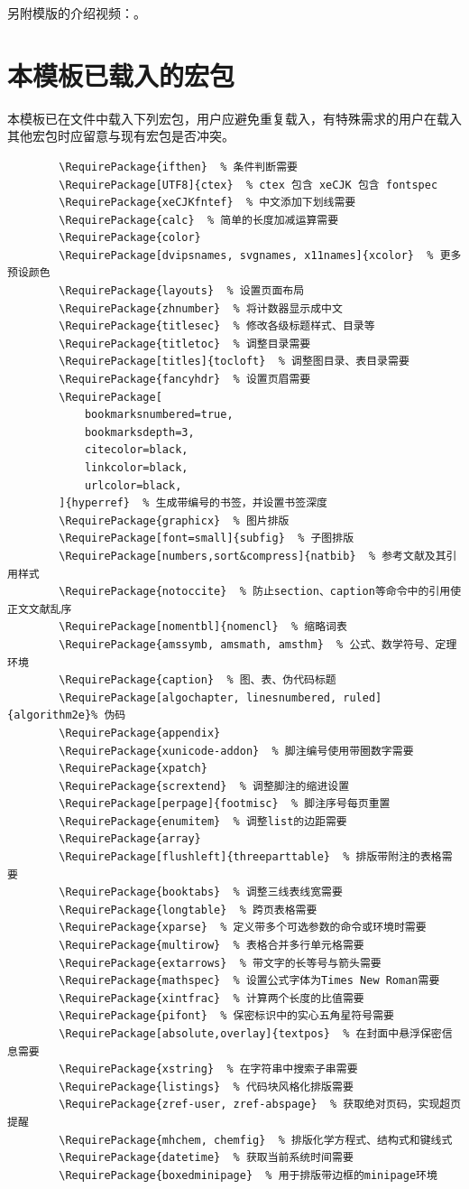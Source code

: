 \documentclass[doctor, vlined, ]{DissertUESTC}
\begin{document}
	另附模版的介绍视频：\href{https://www.bilibili.com/video/BV18MEx6BEnv}{\color{DarkRed}}。


	\section{本模板已载入的宏包}

	本模板已在文件中载入下列宏包，用户应避免重复载入，有特殊需求的用户在载入其他宏包时应留意与现有宏包是否冲突。

	\begin{verbatim}
		\RequirePackage{ifthen}  % 条件判断需要
		\RequirePackage[UTF8]{ctex}  % ctex 包含 xeCJK 包含 fontspec
		\RequirePackage{xeCJKfntef}  % 中文添加下划线需要
		\RequirePackage{calc}  % 简单的长度加减运算需要
		\RequirePackage{color}
		\RequirePackage[dvipsnames, svgnames, x11names]{xcolor}  % 更多预设颜色
		\RequirePackage{layouts}  % 设置页面布局
		\RequirePackage{zhnumber}  % 将计数器显示成中文
		\RequirePackage{titlesec}  % 修改各级标题样式、目录等
		\RequirePackage{titletoc}  % 调整目录需要
		\RequirePackage[titles]{tocloft}  % 调整图目录、表目录需要
		\RequirePackage{fancyhdr}  % 设置页眉需要
		\RequirePackage[
			bookmarksnumbered=true,
			bookmarksdepth=3,
			citecolor=black,
			linkcolor=black,
			urlcolor=black,
		]{hyperref}  % 生成带编号的书签，并设置书签深度
		\RequirePackage{graphicx}  % 图片排版
		\RequirePackage[font=small]{subfig}  % 子图排版
		\RequirePackage[numbers,sort&compress]{natbib}  % 参考文献及其引用样式
		\RequirePackage{notoccite}  % 防止section、caption等命令中的引用使正文文献乱序
		\RequirePackage[nomentbl]{nomencl}  % 缩略词表
		\RequirePackage{amssymb, amsmath, amsthm}  % 公式、数学符号、定理环境
		\RequirePackage{caption}  % 图、表、伪代码标题
		\RequirePackage[algochapter, linesnumbered, ruled]{algorithm2e}% 伪码
		\RequirePackage{appendix}
		\RequirePackage{xunicode-addon}  % 脚注编号使用带圈数字需要
		\RequirePackage{xpatch}
		\RequirePackage{scrextend}  % 调整脚注的缩进设置
		\RequirePackage[perpage]{footmisc}  % 脚注序号每页重置
		\RequirePackage{enumitem}  % 调整list的边距需要
		\RequirePackage{array}
		\RequirePackage[flushleft]{threeparttable}  % 排版带附注的表格需要
		\RequirePackage{booktabs}  % 调整三线表线宽需要
		\RequirePackage{longtable}  % 跨页表格需要
		\RequirePackage{xparse}  % 定义带多个可选参数的命令或环境时需要
		\RequirePackage{multirow}  % 表格合并多行单元格需要
		\RequirePackage{extarrows}  % 带文字的长等号与箭头需要
		\RequirePackage{mathspec}  % 设置公式字体为Times New Roman需要
		\RequirePackage{xintfrac}  % 计算两个长度的比值需要
		\RequirePackage{pifont}  % 保密标识中的实心五角星符号需要
		\RequirePackage[absolute,overlay]{textpos}  % 在封面中悬浮保密信息需要
		\RequirePackage{xstring}  % 在字符串中搜索子串需要
		\RequirePackage{listings}  % 代码块风格化排版需要
		\RequirePackage{zref-user, zref-abspage}  % 获取绝对页码，实现超页提醒
		\RequirePackage{mhchem, chemfig}  % 排版化学方程式、结构式和键线式
		\RequirePackage{datetime}  % 获取当前系统时间需要
		\RequirePackage{boxedminipage}  % 用于排版带边框的minipage环境
	\end{verbatim}
	
\end{document}
